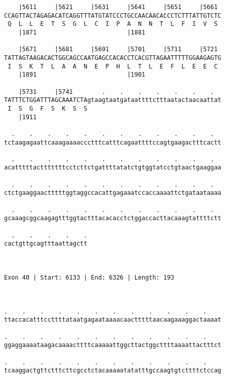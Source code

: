 \documentclass{article}
\begin{document}
\begin{Verbatim}
    |5611     |5621     |5631     |5641     |5651     |5661 
CCAGTTACTAGAGACATCAGGTTTATGTATCCCTGCCAACAACACCCTCTTTATTGTCTC
 Q  L  L  E  T  S  G  L  C  I  P  A  N  N  T  L  F  I  V  S 
    |1871                         |1881                     
  
    |5671     |5681     |5691     |5701     |5711     |5721 
TATTAGTAAGACACTGGCAGCCAATGAGCCACACCTCACGTTAGAATTTTTGGAAGAGTG
 I  S  K  T  L  A  A  N  E  P  H  L  T  L  E  F  L  E  E  C 
    |1891                         |1901                     
  
    |5731     |5741        .    .    .    .    .    .    .  
TATTTCTGGATTTAGCAAATCTAgtaagtaatgataattttctttaatactaacaattat
 I  S  G  F  S  K  S  S                                     
    |1911                                                   
  
  .    .    .    .    .    .    .    .    .    .    .    .  
tctaagagaattcaaagaaaaccctttcatttcagaattttccagtgaagactttcactt
                                                            
  .    .    .    .    .    .    .    .    .    .    .    .  
acatttttactttttttcctcttctgattttatatctgtggtatcctgtaactgaaggaa
                                                            
  .    .    .    .    .    .    .    .    .    .    .    .  
ctctgaaggaactttttggtaggccacattgagaaatccaccaaaattctgataataaaa
                                                            
  .    .    .    .    .    .    .    .    .    .    .    .  
gcaaagcggcaagagtttggtactttacacacctctggaccacttacaaagtattttctt
                                                            
  .    .    .    .    .
cactgttgcagtttaattagctt
                       
                       
 
Exon 40 | Start: 6133 | End: 6326 | Length: 193



.    .    .    .    .    .    .    .    .    .    .    .    
ttaccacatttccttttataatgagaataaaacaactttttaacaagaaaggactaaaat
                                                            
.    .    .    .    .    .    .    .    .    .    .    .    
ggaggaaaataagacaaaacttttcaaaaattggcttactggcttttaaaattactttct
                                                            
.    .    .    .    .    .    .    .    .    .    .    .    
tcaaggactgttctttcttcgcctctacaaaaatatatttgccaagtgtcttttctccag
                                                            

\end{Verbatim}
\end{document}
